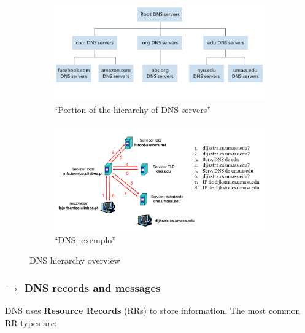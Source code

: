 \begin{figure}[H]
    \begin{subfigure}[b]{0.5\linewidth}%
        \centering
        \includegraphics[width = 1\linewidth]{img/2/dns-hierarchy.png}
        \caption{``Portion of the hierarchy of DNS servers''\protect\cite{Kurose2017}}
        \label{fig:dns-hierarchy}
    \end{subfigure} \hfill
    \begin{subfigure}[b]{0.5\linewidth}%
        \centering
        \includegraphics[width = 1\linewidth]{img/2/dns-hierarchy-example.png}
        \caption{``DNS: exemplo''\protect\cite{slidesSobrinho}}
        \label{fig:dns-hierarchy-example}
    \end{subfigure}%
    \caption{DNS hierarchy overview}
\end{figure}

\subsubsection[2.4.3 DNS records and messages]{$\pmb{\rightarrow}$ DNS records and messages}

DNS uses \textbf{Resource Records} (RRs) to store information. The most common RR types are:

